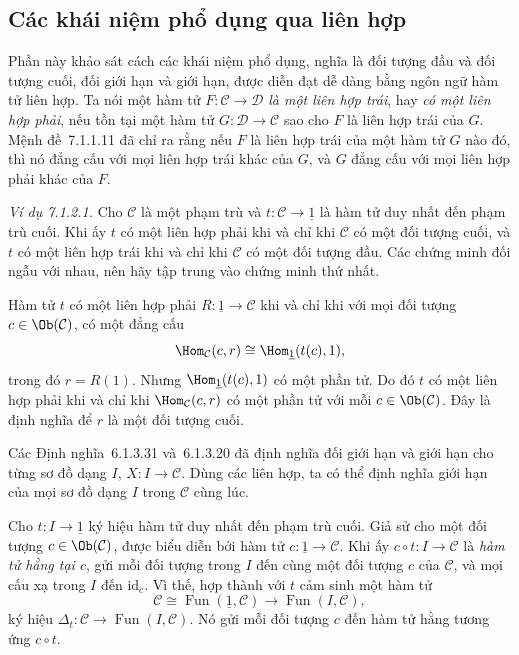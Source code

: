 \subsection{Các khái niệm phổ dụng qua liên hợp}

Phần này khảo sát cách các khái niệm phổ dụng, nghĩa là đối tượng đầu và đối tượng cuối, đối giới hạn và giới hạn, được diễn đạt dễ dàng bằng ngôn ngữ hàm tử liên hợp. Ta nói một hàm tử $F:\mathcal C\to\mathcal D$ \emph{là một liên hợp trái}, hay \emph{có một liên hợp phải}, nếu tồn tại một hàm tử $G:\mathcal D\to\mathcal C$ sao cho $F$ là liên hợp trái của $G$. Mệnh đề~7.1.1.11 đã chỉ ra rằng nếu $F$ là liên hợp trái của một hàm tử $G$ nào đó, thì nó đẳng cấu với mọi liên hợp trái khác của $G$, và $G$ đẳng cấu với mọi liên hợp phải khác của $F$.

\noindent\textit{Ví dụ 7.1.2.1.}\keepwithnext
Cho $\mathcal C$ là một phạm trù và $t:\mathcal C\to\underline1$ là hàm tử duy nhất đến phạm trù cuối. Khi ấy $t$ có một liên hợp phải khi và chỉ khi $\mathcal C$ có một đối tượng cuối, và $t$ có một liên hợp trái khi và chỉ khi $\mathcal C$ có một đối tượng đầu. Các chứng minh đối ngẫu với nhau, nên hãy tập trung vào chứng minh thứ nhất.

Hàm tử $t$ có một liên hợp phải $R:\underline1\to\mathcal C$ khi và chỉ khi với mọi đối tượng $c\in\Ob(\mathcal C)$, có một đẳng cấu
\[
\Hom_{\mathcal C}(c,r)\cong\Hom_{\underline1}(t(c),1),
\]
trong đó $r=R(1)$. Nhưng $\Hom_{\underline1}(t(c),1)$ có một phần tử. Do đó $t$ có một liên hợp phải khi và chỉ khi $\Hom_{\mathcal C}(c,r)$ có một phần tử với mỗi $c\in\Ob(\mathcal C)$. Đây là định nghĩa để $r$ là một đối tượng cuối.

Các Định nghĩa~6.1.3.31 và~6.1.3.20 đã định nghĩa đối giới hạn và giới hạn cho từng sơ đồ dạng $I$, $X:I\to\mathcal C$. Dùng các liên hợp, ta có thể định nghĩa giới hạn của mọi sơ đồ dạng $I$ trong $\mathcal C$ cùng lúc.

Cho $t:I\to\underline1$ ký hiệu hàm tử duy nhất đến phạm trù cuối. Giả sử cho một đối tượng $c\in\Ob(\mathcal C)$, được biểu diễn bởi hàm tử $c:\underline1\to\mathcal C$. Khi ấy $c\circ t:I\to\mathcal C$ là \emph{hàm tử hằng tại $c$}, gửi mỗi đối tượng trong $I$ đến cùng một đối tượng $c$ của $\mathcal C$, và mọi cấu xạ trong $I$ đến $\mathrm{id}_c$. Vì thế, hợp thành với $t$ cảm sinh một hàm tử
\[
\mathcal C\cong\operatorname{Fun}(\underline1,\mathcal C)\longrightarrow\operatorname{Fun}(I,\mathcal C),
\]
ký hiệu $\Delta_t:\mathcal C\to\operatorname{Fun}(I,\mathcal C)$. Nó gửi mỗi đối tượng $c$ đến hàm tử hằng tương ứng $c\circ t$.

